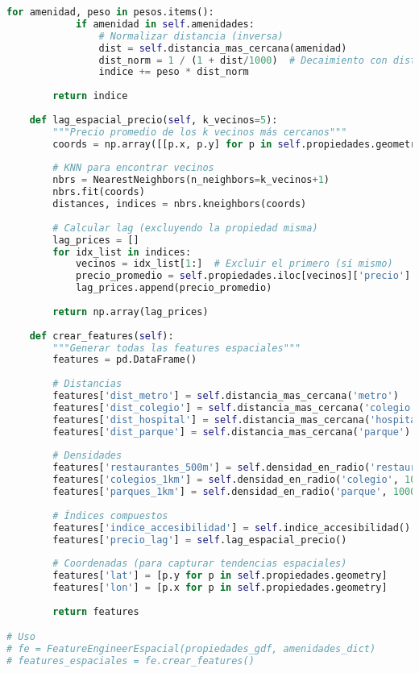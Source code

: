 \documentclass[11pt,a4paper]{article}
\begin{document}
\begin{lstlisting}[language=Python]
        for amenidad, peso in pesos.items():
            if amenidad in self.amenidades:
                # Normalizar distancia (inversa)
                dist = self.distancia_mas_cercana(amenidad)
                dist_norm = 1 / (1 + dist/1000)  # Decaimiento con distancia
                indice += peso * dist_norm
                
        return indice
    
    def lag_espacial_precio(self, k_vecinos=5):
        """Precio promedio de los k vecinos más cercanos"""
        coords = np.array([[p.x, p.y] for p in self.propiedades.geometry])
        
        # KNN para encontrar vecinos
        nbrs = NearestNeighbors(n_neighbors=k_vecinos+1)
        nbrs.fit(coords)
        distances, indices = nbrs.kneighbors(coords)
        
        # Calcular lag (excluyendo la propiedad misma)
        lag_prices = []
        for idx_list in indices:
            vecinos = idx_list[1:]  # Excluir el primero (sí mismo)
            precio_promedio = self.propiedades.iloc[vecinos]['precio'].mean()
            lag_prices.append(precio_promedio)
            
        return np.array(lag_prices)
    
    def crear_features(self):
        """Generar todas las features espaciales"""
        features = pd.DataFrame()
        
        # Distancias
        features['dist_metro'] = self.distancia_mas_cercana('metro')
        features['dist_colegio'] = self.distancia_mas_cercana('colegio')
        features['dist_hospital'] = self.distancia_mas_cercana('hospital')
        features['dist_parque'] = self.distancia_mas_cercana('parque')
        
        # Densidades
        features['restaurantes_500m'] = self.densidad_en_radio('restaurant', 500)
        features['colegios_1km'] = self.densidad_en_radio('colegio', 1000)
        features['parques_1km'] = self.densidad_en_radio('parque', 1000)
        
        # Índices compuestos
        features['indice_accesibilidad'] = self.indice_accesibilidad()
        features['precio_lag'] = self.lag_espacial_precio()
        
        # Coordenadas (para capturar tendencias espaciales)
        features['lat'] = [p.y for p in self.propiedades.geometry]
        features['lon'] = [p.x for p in self.propiedades.geometry]
        
        return features

# Uso
# fe = FeatureEngineerEspacial(propiedades_gdf, amenidades_dict)
# features_espaciales = fe.crear_features()
\end{lstlisting}
\end{document}
